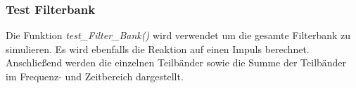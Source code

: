 \subsubsection{Test Filterbank}\label{sec:impl_testBank}
Die Funktion \emph{test\_Filter\_Bank()} wird verwendet um die gesamte Filterbank zu simulieren. Es wird ebenfalls die Reaktion auf einen Impuls berechnet. Anschließend werden die einzelnen Teilbänder sowie die Summe der Teilbänder im Frequenz- und Zeitbereich dargestellt.

